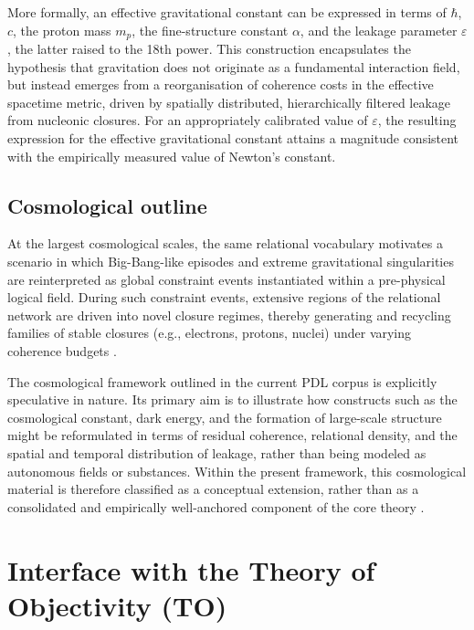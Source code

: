 \documentclass[11pt,a4paper]{article}
\begin{document}
More formally, an effective gravitational constant can be expressed in terms of \(\hbar\), \(c\), the proton mass \(m_p\), the fine-structure constant \(\alpha\), and the leakage parameter \(\varepsilon\), the latter raised to the 18th power. This construction encapsulates the hypothesis that gravitation does not originate as a fundamental interaction field, but instead emerges from a reorganisation of coherence costs in the effective spacetime metric, driven by spatially distributed, hierarchically filtered leakage from nucleonic closures. For an appropriately calibrated value of \(\varepsilon\), the resulting expression for the effective gravitational constant attains a magnitude consistent with the empirically measured value of Newton’s constant.\citep{Exponent_18_PDL_2026,Coherence_Leakage_18_2026,PDL_position}

\subsection{Cosmological outline}
\label{subsec:cosmology_outline}

At the largest cosmological scales, the same relational vocabulary motivates a scenario in which Big-Bang-like episodes and extreme gravitational singularities are reinterpreted as global constraint events instantiated within a pre-physical logical field. During such constraint events, extensive regions of the relational network are driven into novel closure regimes, thereby generating and recycling families of stable closures (e.g., electrons, protons, nuclei) under varying coherence budgets \citep{PDL_Main_2026,PDL_position}.

The cosmological framework outlined in the current PDL corpus is explicitly speculative in nature. Its primary aim is to illustrate how constructs such as the cosmological constant, dark energy, and the formation of large-scale structure might be reformulated in terms of residual coherence, relational density, and the spatial and temporal distribution of leakage, rather than being modeled as autonomous fields or substances. Within the present framework, this cosmological material is therefore classified as a conceptual extension, rather than as a consolidated and empirically well-anchored component of the core theory \citep{PDL_Main_2026,PDL_position}.

\section{Interface with the Theory of Objectivity (TO)}
\label{sec:TO_interface}
\end{document}
